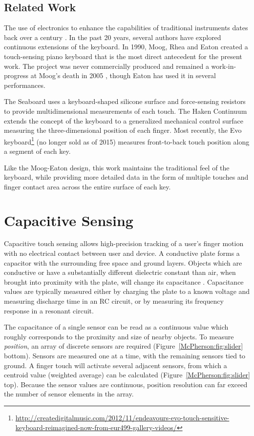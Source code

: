 \subsection{Related Work}
The use of electronics to enhance the capabilities of traditional instruments dates back over a century \cite{Roads:1996}. In the past 20 years, several authors have explored continuous extensions of the keyboard. In 1990, Moog, Rhea and Eaton created a touch-sensing piano keyboard \cite{Eaton:2005,Moog:1990} that is the most direct antecedent for the present work. The project was never commercially produced and remained a work-in-progress at Moog's death in 2005 \cite{Star-Ledger:2006}, though Eaton has used it in several performances.

The Seaboard \cite{Lamb:2011} uses a keyboard-shaped silicone surface and force-sensing resistors to provide multidimensional measurements of each touch. The Haken Continuum \cite{Haken:1998} extends the concept of the keyboard to a generalized mechanical control surface measuring the three-dimensional position of each finger. Most recently, the Evo keyboard\footnote{\url{http://createdigitalmusic.com/2012/11/endeavours-evo-touch-sensitive-keyboard-reimagined-now-from-eur499-gallery-videos/}} (no longer sold as of 2015) measures front-to-back touch position along a segment of each key.

Like the Moog-Eaton design, this work maintains the traditional feel of the keyboard, while providing more detailed data in the form of multiple touches and finger contact area across the entire surface of each key.

\section{Capacitive Sensing}
Capacitive touch sensing allows high-precision tracking of a user's finger motion with no electrical contact between user and device. A conductive plate forms a capacitor with the surrounding free space and ground layers. Objects which are conductive or have a substantially different dielectric constant than air, when brought into proximity with the plate, will change its capacitance \cite{Paradiso:1997b}. Capacitance values are typically measured either by charging the plate to a known voltage and measuring discharge time in an RC circuit, or by measuring its frequency response in a resonant circuit.

The capacitance of a single sensor can be read as a continuous value which roughly corresponds to the proximity and size of nearby objects. To measure {\it position}, an array of discrete sensors are required (Figure~\ref{McPherson:fig:slider} bottom). Sensors are measured one at a time, with the remaining sensors tied to ground. A finger touch will activate several adjacent sensors, from which a centroid value (weighted average) can be calculated (Figure~\ref{McPherson:fig:slider} top). Because the sensor values are continuous, position resolution can far exceed the number of sensor elements in the array.

